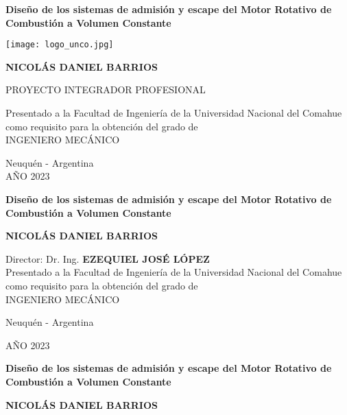 \thispagestyle{empty}

\begin{center}

\Large\textbf{{Diseño de los sistemas de admisión y escape del Motor Rotativo de Combustión a Volumen Constante\\}}

\vspace{1cm}

\texttt{[image: logo\_unco.jpg]}\\

\vspace{1cm}

\Large{\textbf{
NICOLÁS DANIEL BARRIOS\\
}}
\vspace{1cm}

PROYECTO INTEGRADOR PROFESIONAL\\

\vspace{1cm}

Presentado a la Facultad de Ingeniería de la Universidad Nacional del Comahue como requisito para la obtención del grado de \\ INGENIERO MECÁNICO

\vspace{0.5cm}

Neuquén - Argentina\\
AÑO 2023

\vspace{1cm}

\pagebreak
\thispagestyle{empty}

\Large\textbf{{Diseño de los sistemas de admisión y escape del Motor Rotativo de Combustión a Volumen Constante\\}}

\vspace{4cm}

\large{\textbf{
NICOLÁS DANIEL BARRIOS\\
}}

\vspace{4cm}
Director: Dr. Ing. \textbf{EZEQUIEL JOSÉ LÓPEZ}\\


\vspace{3cm}
Presentado a la Facultad de Ingeniería de la Universidad Nacional del Comahue como requisito para la obtención del grado de \\ INGENIERO MECÁNICO

\vfill
Neuquén - Argentina

AÑO 2023

\newpage
\thispagestyle{plain}

\Large\textbf{{Diseño de los sistemas de admisión y escape del Motor Rotativo
    de Combustión a Volumen Constante \\}}

\vspace{3cm}

\large{\textbf{
NICOLÁS DANIEL BARRIOS
}}\\
\vspace{3cm}
\end{center}

